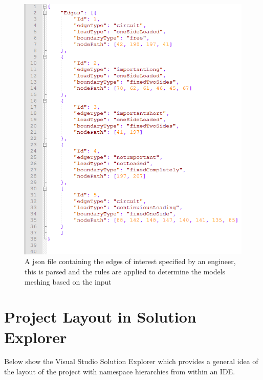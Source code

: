 \begin{figure}[H]
  \centerline{\includegraphics[width=120mm,  scale=0.5]{../Graphics/jsonEdgeFileLayout.png}}
  \caption{A json file containing the edges of interest specified by an engineer, this is parsed and the rules are applied to determine the models meshing based on the input}
\end{figure}




\newpage
\section{Project Layout in Solution Explorer}
Below show the Visual Studio Solution Explorer which provides a general idea of the layout of the project with namespace hierarchies from within an IDE.

